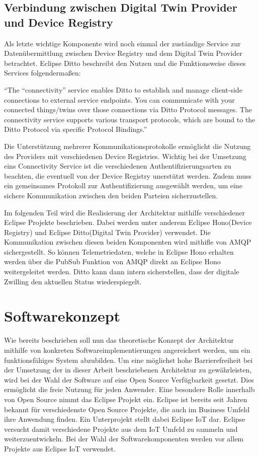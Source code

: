 \subsection{Verbindung zwischen Digital Twin Provider und Device Registry}

Als letzte wichtige Komponente wird noch einmal der zuständige Service zur Datenübermittlung zwischen Device Registry und dem Digital Twin Provider betrachtet. Eclipse Ditto beschreibt den Nutzen und die Funktionsweise dieses Services folgendermaßen:

\enquote{The “connectivity” service enables Ditto to establish and manage client-side connections to external service endpoints. You can communicate with your connected things/twins over those connections via Ditto Protocol messages. The connectivity service supports various transport protocols, which are bound to the Ditto Protocol via specific Protocol Bindings.}\autocite{ditto}

Die Unterstützung mehrerer Kommunikationsprotokolle ermöglicht die Nutzung des Providers mit verschiedenen Device Registries. Wichtig bei der Umsetzung eins Connectivity Service ist die verschiedenen Authentifizierungsarten zu beachten, die eventuell von der Device Registry unerstützt werden. Zudem muss ein gemeinsames Protokoll zur Authentifizierung ausgewählt werden, um eine sichere Kommunikation zwischen den beiden Parteien sicherzustellen.

Im folgenden Teil wird die Realisierung der Architektur mithilfe verschiedener Eclipse Projekte beschrieben. Dabei werden unter anderem Eclipse Hono(Device Registry) und Eclipse Ditto(Digital Twin Provider) verwendet. Die Kommunikation zwischen diesen beiden Komponenten wird mithifle von \ac{AMQP} sichergestellt. So können Telemetriedaten, welche in Eclipse Hono erhalten werden über die PubSub Funktion von AMQP direkt an Eclipse Hono weitergeleitet werden. Ditto kann dann intern sicherstellen, dass der digitale Zwilling den aktuellen Status wiederspiegelt.

\section{Softwarekonzept}

Wie bereits beschrieben soll nun das theoretische Konzept der Architektur mithilfe von konkreten Softwareimplementierungen angereichert werden, um ein funktionsfähiges System abzubilden. Um eine möglichst hohe Barrierefreiheit bei der Umsetzung der in dieser Arbeit beschriebenen Architektur zu gewährleisten, wird bei der Wahl der Software auf eine Open Source Verfügbarkeit gesetzt. Dies ermöglicht die freie Nutzung für jeden Anwender. Eine besondere Rolle innerhalb von Open Source nimmt das Eclipse Projekt ein. Eclipse ist bereits seit Jahren bekannt für verschiedenste Open Source Projekte, die auch im Business Umfeld ihre Anwendung finden. Ein Unterprojekt stellt dabei Eclipse IoT dar. Eclipse versucht damit verschiedene Projekte aus dem IoT Umfeld zu sammeln und weiterzuentwickeln. Bei der Wahl der Softwarekomponenten werden vor allem Projekte aus Eclipse IoT verwendet.

